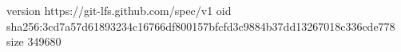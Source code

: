 version https://git-lfs.github.com/spec/v1
oid sha256:3cd7a57d61893234c16766df800157bfcfd3c9884b37dd13267018c336cde778
size 349680
